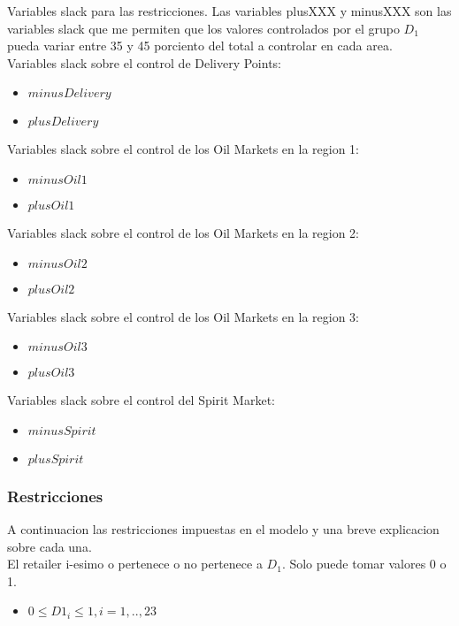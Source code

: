 Variables slack para las restricciones. Las variables plusXXX y minusXXX son las variables slack que me permiten que los valores
controlados por el grupo $D_1$ pueda variar entre 35 y 45 porciento del total a controlar en cada area. \\
Variables slack sobre el control de Delivery Points: \\
\begin{itemize}
\item $minusDelivery$ \\
\item $plusDelivery$ \\
\end{itemize}
Variables slack sobre el control de los Oil Markets en la region 1: \\
\begin{itemize}
\item $minusOil1$ \\
\item $plusOil1$ \\
\end{itemize}
Variables slack sobre el control de los Oil Markets en la region 2: \\
\begin{itemize}
\item $minusOil2$ \\
\item $plusOil2$ \\
\end{itemize}
Variables slack sobre el control de los Oil Markets en la region 3: \\
\begin{itemize}
\item $minusOil3$ \\
\item $plusOil3$ \\
\end{itemize}
Variables slack sobre el control del Spirit Market: \\
\begin{itemize}
\item $minusSpirit$ \\
\item $plusSpirit$ \\
\end{itemize}
\subsubsection{Restricciones}
A continuacion las restricciones impuestas en el modelo y una breve explicacion sobre cada una. \\
El retailer i-esimo o pertenece o no pertenece a $D_1$. Solo puede tomar valores 0 o 1. \\
\begin{itemize}
\item $0 \leq {D1}_i \leq 1 ,  i = 1,..,23 $ \\
\end{itemize}

